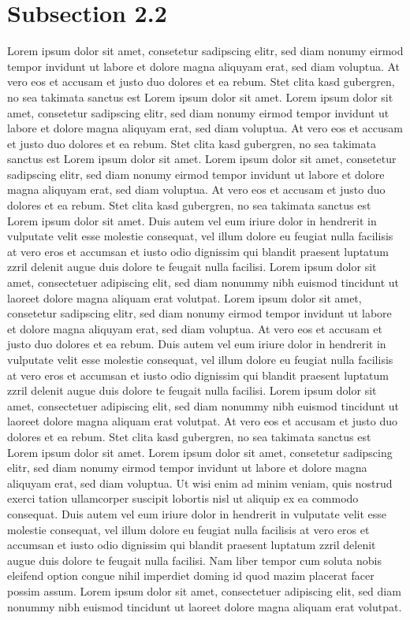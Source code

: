 \documentclass[11pt, a4paper, twoside]{report}
\begin{document}
\section{Subsection 2.2} \label{sec:subsection_22}

Lorem ipsum dolor sit amet, consetetur sadipscing elitr, sed diam nonumy eirmod tempor invidunt ut labore et dolore magna aliquyam erat, sed diam voluptua. At vero eos et accusam et justo duo dolores et ea rebum. Stet clita kasd gubergren, no sea takimata sanctus est Lorem ipsum dolor sit amet. Lorem ipsum dolor sit amet, consetetur sadipscing elitr, sed diam nonumy eirmod tempor invidunt ut labore et dolore magna aliquyam erat, sed diam voluptua. At vero eos et accusam et justo duo dolores et ea rebum. Stet clita kasd gubergren, no sea takimata sanctus est Lorem ipsum dolor sit amet. Lorem ipsum dolor sit amet, consetetur sadipscing elitr, sed diam nonumy eirmod tempor invidunt ut labore et dolore magna aliquyam erat, sed diam voluptua. At vero eos et accusam et justo duo dolores et ea rebum. Stet clita kasd gubergren, no sea takimata sanctus est Lorem ipsum dolor sit amet.
Duis autem vel eum iriure dolor in hendrerit in vulputate velit esse molestie consequat, vel illum dolore eu feugiat nulla facilisis at vero eros et accumsan et iusto odio dignissim qui blandit praesent luptatum zzril delenit augue duis dolore te feugait nulla facilisi. Lorem ipsum dolor sit amet, consectetuer adipiscing elit, sed diam nonummy nibh euismod tincidunt ut laoreet dolore magna aliquam erat volutpat.
Lorem ipsum dolor sit amet, consetetur sadipscing elitr, sed diam nonumy eirmod tempor invidunt ut labore et dolore magna aliquyam erat, sed diam voluptua. At vero eos et accusam et justo duo dolores et ea rebum. Duis autem vel eum iriure dolor in hendrerit in vulputate velit esse molestie consequat, vel illum dolore eu feugiat nulla facilisis at vero eros et accumsan et iusto odio dignissim qui blandit praesent luptatum zzril delenit augue duis dolore te feugait nulla facilisi. Lorem ipsum dolor sit amet, consectetuer adipiscing elit, sed diam nonummy nibh euismod tincidunt ut laoreet dolore magna aliquam erat volutpat.
At vero eos et accusam et justo duo dolores et ea rebum. Stet clita kasd gubergren, no sea takimata sanctus est Lorem ipsum dolor sit amet. Lorem ipsum dolor sit amet, consetetur sadipscing elitr, sed diam nonumy eirmod tempor invidunt ut labore et dolore magna aliquyam erat, sed diam voluptua. Ut wisi enim ad minim veniam, quis nostrud exerci tation ullamcorper suscipit lobortis nisl ut aliquip ex ea commodo consequat. Duis autem vel eum iriure dolor in hendrerit in vulputate velit esse molestie consequat, vel illum dolore eu feugiat nulla facilisis at vero eros et accumsan et iusto odio dignissim qui blandit praesent luptatum zzril delenit augue duis dolore te feugait nulla facilisi.
Nam liber tempor cum soluta nobis eleifend option congue nihil imperdiet doming id quod mazim placerat facer possim assum. Lorem ipsum dolor sit amet, consectetuer adipiscing elit, sed diam nonummy nibh euismod tincidunt ut laoreet dolore magna aliquam erat volutpat.
\end{document}
